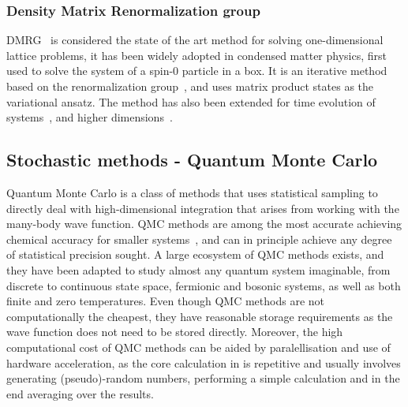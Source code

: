 \subsubsection{Density Matrix Renormalization group}
DMRG~\cite{white1992density} is considered the state of the art method for solving one-dimensional lattice problems, it has been widely adopted in condensed matter physics, first used to solve the system of a spin-0 particle in a box. It is an iterative method based on the renormalization group~\cite{wilson1975renormalization}, and uses matrix product states as the variational ansatz. The method has also been extended for time evolution of systems~\cite{feiguin2005time}, and higher dimensions~\cite{verstraete2004renormalization}.

\subsection{Stochastic methods - Quantum Monte Carlo}
\label{subsec:qmc-overview}
Quantum Monte Carlo is a class of methods that uses statistical sampling to directly deal with high-dimensional integration that arises from working with the many-body wave function. QMC methods are among the most accurate achieving chemical accuracy for smaller systems~\cite{foulkes2001quantum}, and can in principle achieve any degree of statistical precision sought. A large ecosystem of QMC methods exists, and they have been adapted to study almost any quantum system imaginable, from discrete to continuous state space, fermionic and bosonic systems, as well as both finite and zero temperatures. Even though QMC methods are not computationally the cheapest, they have reasonable storage requirements as the wave function does not need to be stored directly. Moreover, the high computational cost of QMC methods can be aided by paralellisation and use of hardware acceleration, as the core calculation in is repetitive and usually involves generating (pseudo)-random numbers, performing a simple calculation and in the end averaging over the results. 


